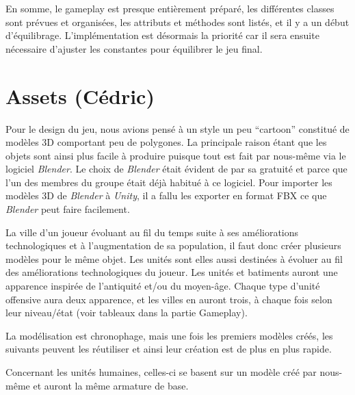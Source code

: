 \documentclass[12pt]{report}
\begin{document}
En somme, le gameplay est presque entièrement préparé, les différentes classes sont prévues et organisées, les attributs et méthodes sont listés, et il y a un début d’équilibrage. L'implémentation est désormais la priorité car il sera ensuite nécessaire d'ajuster les constantes pour équilibrer le jeu final.

\section{Assets (Cédric)}

Pour le design du jeu, nous avions pensé à un style un peu “cartoon” constitué de modèles 3D comportant peu de polygones. La principale raison étant que les objets sont ainsi plus facile à produire puisque tout est fait par nous-même via le logiciel \textit{Blender}. Le choix de \textit{Blender} était évident de par sa gratuité et parce que l’un des membres du groupe était déjà habitué à ce logiciel. Pour importer les modèles 3D de \textit{Blender} à \textit{Unity}, il a fallu les exporter en format FBX ce que \textit{Blender} peut faire facilement.

La ville d’un joueur évoluant au fil du temps suite à ses améliorations technologiques et à l’augmentation de sa population, il faut donc créer plusieurs modèles pour le même objet. Les unités sont elles aussi destinées à évoluer au fil des améliorations technologiques du joueur. Les unités et batiments auront une apparence inspirée de l'antiquité et/ou du moyen-âge. Chaque type d'unité offensive aura deux apparence, et les villes en auront trois, à chaque fois selon leur niveau/état (voir tableaux dans la partie Gameplay).

\newpage

La modélisation est chronophage, mais une fois les premiers modèles créés, les suivants peuvent les réutiliser et ainsi leur création est de plus en plus rapide.

Concernant les unités humaines, celles-ci se basent sur un modèle créé par nous-même et auront la même armature de base.
\end{document}
